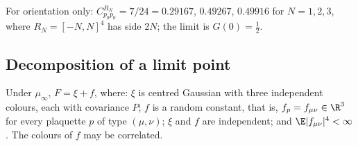 For orientation only: $C^{R_N}_{p_0p_0}=7/24=0.29167$, $0.49267$, $0.49916$ for $N=1,2,3$, where $R_N=[-N,N]^4$ has side $2N$; the limit is $G(0)=\tfrac12$.

\subsection{Decomposition of a limit point}\label{pf:sec-R}

\begin{lemma}\label{pf:lem-R}
Under $\mu_\infty$, $F=\xi+f$, where:
$\xi$ is centred Gaussian with three independent colours, each with covariance $P$;
$f$ is a random constant, that is, $f_p=f_{\mu\nu}\in\R^3$ for every plaquette $p$ of type $(\mu,\nu)$;
$\xi$ and $f$ are independent; and $\E|f_{\mu\nu}|^4<\infty$.
The colours of $f$ may be correlated.
\end{lemma}

